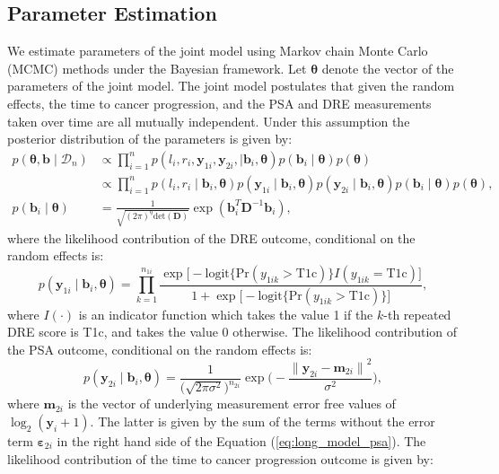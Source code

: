 \subsection{Parameter Estimation}
We estimate parameters of the joint model using Markov chain Monte Carlo (MCMC) methods under the Bayesian framework. Let $\boldsymbol{\theta}$ denote the vector of the parameters of the joint model. The joint model postulates that given the random effects, the time to cancer progression, and the PSA and DRE measurements taken over time are all mutually independent. Under this assumption the posterior distribution of the parameters is given by:
\begin{align*}
p(\boldsymbol{\theta}, \boldsymbol{b} \mid \mathcal{D}_n) & \propto \prod_{i=1}^n p(l_i, r_i, \boldsymbol{y}_{1i}, \boldsymbol{y}_{2i}, \mid \boldsymbol{b}_i, \boldsymbol{\theta}) p(\boldsymbol{b}_i \mid \boldsymbol{\theta}) p(\boldsymbol{\theta})\\
& \propto \prod_{i=1}^n p(l_i, r_i \mid \boldsymbol{b}_i, \boldsymbol{\theta}) p(\boldsymbol{y}_{1i} \mid \boldsymbol{b}_i, \boldsymbol{\theta}) p(\boldsymbol{y}_{2i} \mid \boldsymbol{b}_i, \boldsymbol{\theta}) p(\boldsymbol{b}_i \mid \boldsymbol{\theta}) p(\boldsymbol{\theta}),\\
p(\boldsymbol{b}_i \mid \boldsymbol{\theta}) &= \frac{1}{\sqrt{(2 \pi)^q \text{det}(\boldsymbol{D})}} \exp(\boldsymbol{b}_i^T \boldsymbol{D}^{-1} \boldsymbol{b}_i),
\end{align*}
where the likelihood contribution of the DRE outcome, conditional on the random effects is:
\begin{equation*}
p(\boldsymbol{y}_{1i} \mid \boldsymbol{b}_i, \boldsymbol{\theta}) = \prod_{k=1}^{n_{1i}} \frac{\exp\Big[-\mbox{logit} \big\{\mbox{Pr}(y_{1ik} > \mbox{T1c})\big\} I(y_{1ik}=\mbox{T1c}) \Big]}  {1+\exp\Big[-\mbox{logit} \big\{\mbox{Pr}(y_{1ik} > \mbox{T1c})\big\}\Big]},
\end{equation*}
where $I(\cdot)$ is an indicator function which takes the value 1 if the $k$-th repeated DRE score is T1c, and takes the value 0 otherwise. The likelihood contribution of the PSA outcome, conditional on the random effects is:
\begin{equation*}
p(\boldsymbol{y}_{2i} \mid \boldsymbol{b}_i, \boldsymbol{\theta}) = \frac{1}{\big(\sqrt{2 \pi \sigma^2}\big)^{n_{2i}}} \exp\bigg(-\frac{{\lVert{\boldsymbol{y}_{2i} - \boldsymbol{m}_{2i}}\rVert}^2}{\sigma^2}\bigg),
\end{equation*}
where $\boldsymbol{m}_{2i}$ is the vector of underlying measurement error free values of $\log_2(\boldsymbol{y}_i + 1)$. The latter is given by the sum of the terms without the error term $\boldsymbol{\varepsilon}_{2i}$ in the right hand side of the Equation (\ref{eq:long_model_psa}). The likelihood contribution of the time to cancer progression outcome is given by:
